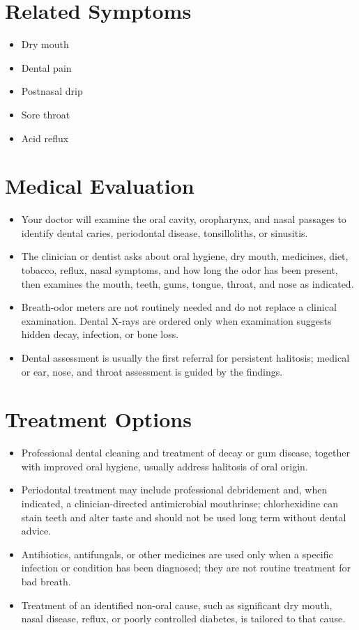 \section*{Related Symptoms}
\begin{itemize}
 \item Dry mouth
 \item Dental pain
 \item Postnasal drip
 \item Sore throat
 \item Acid reflux
\end{itemize}

\section*{Medical Evaluation}
\begin{itemize}
 \item Your doctor will examine the oral cavity, oropharynx, and nasal passages to identify dental caries, periodontal disease, tonsilloliths, or sinusitis.
 \item The clinician or dentist asks about oral hygiene, dry mouth, medicines, diet, tobacco, reflux, nasal symptoms, and how long the odor has been present, then examines the mouth, teeth, gums, tongue, throat, and nose as indicated.
 \item Breath-odor meters are not routinely needed and do not replace a clinical examination. Dental X-rays are ordered only when examination suggests hidden decay, infection, or bone loss.
 \item Dental assessment is usually the first referral for persistent halitosis; medical or ear, nose, and throat assessment is guided by the findings.
\end{itemize}

\section*{Treatment Options}
\begin{itemize}
 \item Professional dental cleaning and treatment of decay or gum disease, together with improved oral hygiene, usually address halitosis of oral origin.
 \item Periodontal treatment may include professional debridement and, when indicated, a clinician-directed antimicrobial mouthrinse; chlorhexidine can stain teeth and alter taste and should not be used long term without dental advice.
 \item Antibiotics, antifungals, or other medicines are used only when a specific infection or condition has been diagnosed; they are not routine treatment for bad breath.
 \item Treatment of an identified non-oral cause, such as significant dry mouth, nasal disease, reflux, or poorly controlled diabetes, is tailored to that cause.
\end{itemize}

